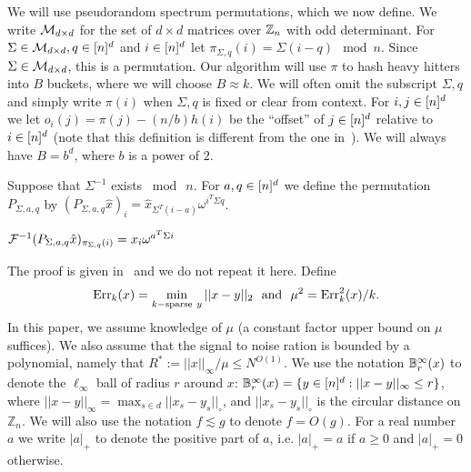 We will use pseudorandom spectrum permutations, which we now define.  We write $\mathcal{M}_{d\times d}$ for the set of $d\times d$ matrices  over $\mathbb{Z}_n$ with odd determinant.
For $\Sigma\in \mathcal{M}_{d\times d}, q\in {[n]^d}$ and $i\in {[n]^d}$ let 
$\pi_{\Sigma, q}(i)=\Sigma(i-q) \mod n$.
Since $\Sigma\in \mathcal{M}_{d\times d}$, this is a permutation. Our algorithm will use $\pi$ to hash heavy hitters into $B$ buckets, where we will choose $B\approx k$. We will often omit the subscript $\Sigma, q$ and simply write $\pi(i)$ when $\Sigma, q$ is fixed or clear from context. For $i, j\in {[n]^d}$ we let $o_i(j)= \pi(j) - (n/b) h(i)$  be the ``offset'' of $j\in {[n]^d}$ relative to $i\in {[n]^d}$ (note that this definition is different from the one in~\cite{IK14a}). We will always have $B=b^d$, where $b$ is a power of $2$. 
\begin{definition}
  Suppose that $\Sigma^{-1}$ exists $\bmod~n$. For $a, q\in {[n]^d}$ we define the
  permutation $P_{\Sigma, a, q}$ by $(P_{\Sigma, a, q}\hat x)_i=\hat x_{\Sigma^T(i-a)} \omega^{i^T\Sigma q}$.  
\end{definition}
\begin{lemma}\label{lm:perm}
$\mathcal{F}^{-1}({P_{\Sigma, a, q} \hat x})_{\pi_{\Sigma, q}(i)}=x_i \omega^{a^T \Sigma i}$
\end{lemma}
The proof is given in~\cite{IK14a} and we do not repeat it here. 
Define 
\begin{equation}\label{eq:mu-def}
\begin{split}
\operatorname{Err}_k(x)=\min_{k-\text{sparse}~y} ||x-y||_2\text{~~and~~}\mu^2=\operatorname{Err}_k^2(x)/k.
\end{split}
\end{equation}
In this paper, we assume knowledge of $\mu$ (a constant factor upper bound on $\mu$ suffices). We also assume that the signal to noise ration is bounded by a polynomial, namely 
that $R^*:=||x||_\infty/\mu\leq N^{O(1)}$. 
We use the notation $\mathbb{B}^\infty_{r}(x)$ to denote the $\ell_\infty$ ball of radius $r$ around $x$:
$\mathbb{B}^\infty_{r}(x)=\{y\in {[n]^d}: ||x-y||_\infty\leq r\}$, where $||x-y||_\infty=\max_{s\in d} ||x_s-y_s||_{\circ}$, and $||x_s-y_s||_{\circ}$ is the circular distance on $\mathbb{Z}_n$. 
We will also use the notation $f\lesssim g$ to denote $f=O(g)$. For a real number $a$ we write $|a|_+$ to denote the positive part of $a$, i.e. $|a|_+=a$ if $a\geq 0$ and $|a|_+=0$ otherwise.


